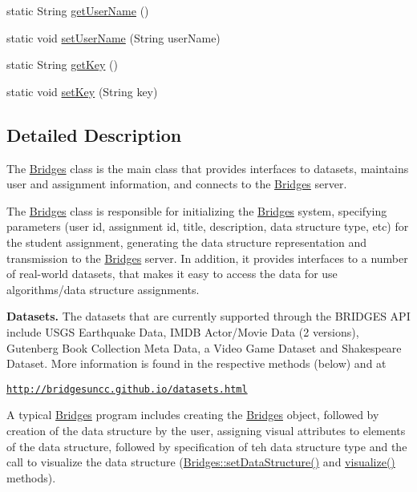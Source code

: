 \begin{DoxyCompactItemize}
\item 
static String \mbox{\hyperlink{classbridges_1_1connect_1_1_bridges_a75f047cda3100e0cfa88378293c12961}{get\+User\+Name}} ()
\item 
static void \mbox{\hyperlink{classbridges_1_1connect_1_1_bridges_af9b9a2ca03ba02c0c2be4716594678a6}{set\+User\+Name}} (String user\+Name)
\item 
static String \mbox{\hyperlink{classbridges_1_1connect_1_1_bridges_a426897d6e5449601bb4e20c32b8346f5}{get\+Key}} ()
\item 
static void \mbox{\hyperlink{classbridges_1_1connect_1_1_bridges_ab69e89ec7d2e674a8b8c4b0be0c63397}{set\+Key}} (String key)
\end{DoxyCompactItemize}


\subsection{Detailed Description}
The \mbox{\hyperlink{classbridges_1_1connect_1_1_bridges}{Bridges}} class is the main class that provides interfaces to datasets, maintains user and assignment information, and connects to the \mbox{\hyperlink{classbridges_1_1connect_1_1_bridges}{Bridges}} server. 

The \mbox{\hyperlink{classbridges_1_1connect_1_1_bridges}{Bridges}} class is responsible for initializing the \mbox{\hyperlink{classbridges_1_1connect_1_1_bridges}{Bridges}} system, specifying parameters (user id, assignment id, title, description, data structure type, etc) for the student assignment, generating the data structure representation and transmission to the \mbox{\hyperlink{classbridges_1_1connect_1_1_bridges}{Bridges}} server. In addition, it provides interfaces to a number of real-\/world datasets, that makes it easy to access the data for use algorithms/data structure assignments. ~\newline


{\bfseries Datasets.} The datasets that are currently supported through the B\+R\+I\+D\+G\+ES A\+PI include U\+S\+GS Earthquake Data, I\+M\+DB Actor/\+Movie Data (2 versions), Gutenberg Book Collection Meta Data, a Video Game Dataset and Shakespeare Dataset. More information is found in the respective methods (below) and at 

\href{http://bridgesuncc.github.io/datasets.html}{\tt http\+://bridgesuncc.\+github.\+io/datasets.\+html} 

A typical \mbox{\hyperlink{classbridges_1_1connect_1_1_bridges}{Bridges}} program includes creating the \mbox{\hyperlink{classbridges_1_1connect_1_1_bridges}{Bridges}} object, followed by creation of the data structure by the user, assigning visual attributes to elements of the data structure, followed by specification of teh data structure type and the call to visualize the data structure (\mbox{\hyperlink{classbridges_1_1connect_1_1_bridges_a921a6603b2445b1abe30a1b3d6f0c255}{Bridges\+::set\+Data\+Structure()}} and \mbox{\hyperlink{classbridges_1_1connect_1_1_bridges_a1853d64ffb8675ba2ec227a2b819cd24}{visualize()}} methods).

